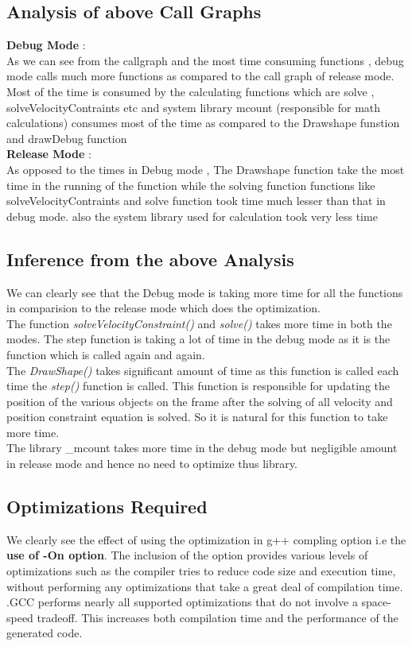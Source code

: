 \documentclass[11pt,]{article}
\begin{document}
\begin{singlespace}
\subsection{Analysis of above Call Graphs}
\textbf{Debug Mode} :\\
As we can see from the callgraph and the most time consuming functions , debug mode calls much more functions as compared to the call graph of release mode.
Most of the time is consumed by the calculating functions which are solve , solveVelocityContraints etc and system library mcount (responsible for math calculations)
 consumes most of the time as compared to the Drawshape funstion and drawDebug function\\
\textbf{Release Mode} :\\
As opposed to the times in Debug mode , The Drawshape function take the most time in the running of the function while the solving function functions like
solveVelocityContraints and solve function took time much lesser than that in debug mode. also the system library used for calculation took very less
time 

\subsection{Inference from the above Analysis}
We can clearly see that the Debug mode is taking more time for all the functions in comparision to the release mode which does the optimization.\\
The function \emph{solveVelocityConstraint()} and \emph{solve()} takes more time in both the modes.
The step function is taking a lot of time in the debug mode as it is the function which is called again and again. \\
The \emph{DrawShape()} takes significant amount of time as this function is called each time the \emph{step()} function is called.
This function is responsible for updating the position of the various objects on the frame after the solving of all velocity and position 
constraint equation is solved. So it is natural for this function to take more time. \\
The library \_mcount takes more time in the debug mode but negligible amount in release mode and hence no need to optimize thus library.\\

\subsection{Optimizations Required}
We clearly see the effect of using the optimization in g++ compling option i.e the \textbf{use of -On option}. The inclusion of the option
provides various levels of optimizations such as the compiler tries to reduce code size and execution time, without performing any optimizations that take a great deal of compilation time. 
.GCC performs nearly all supported optimizations that do not involve a space-speed tradeoff. This increases both compilation time and the performance of the generated code.\\


\end{singlespace}
\end{document}
